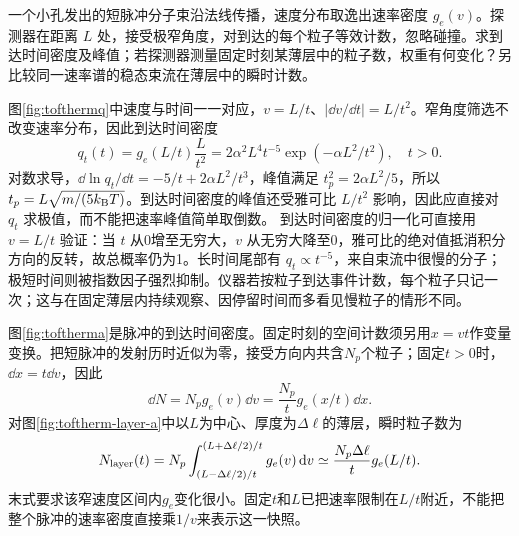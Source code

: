 \begin{example}[时间飞行测温中的两种探测权重]
一个小孔发出的短脉冲分子束沿法线传播，速度分布取逸出速率密度 $g_e(v)$。探测器在距离 $L$ 处，接受极窄角度，对到达的每个粒子等效计数，忽略碰撞。求到达时间密度及峰值；若探测器测量固定时刻某薄层中的粒子数，权重有何变化？另比较同一速率谱的稳态束流在薄层中的瞬时计数。
\end{example}
\begin{solution}
图\ref{fig:tofthermq}中速度与时间一一对应，$v=L/t$、$|\dd v/\dd t|=L/t^2$。窄角度筛选不改变速率分布，因此到达时间密度
\[
 q_t(t)=g_e(L/t)\frac L{t^2}
 =2\alpha^2L^4t^{-5}\exp(-\alpha L^2/t^2),\quad t>0.
\]
对数求导，$\dd\ln q_t/\dd t=-5/t+2\alpha L^2/t^3$，峰值满足 $t_p^2=2\alpha L^2/5$，所以 $t_p=L\sqrt{m/(5k_{\mathrm B} T)}$。到达时间密度的峰值还受雅可比 $L/t^2$ 影响，因此应直接对 $q_t$ 求极值，而不能把速率峰值简单取倒数。
到达时间密度的归一化可直接用 $v=L/t$ 验证：当 $t$ 从0增至无穷大，$v$ 从无穷大降至0，雅可比的绝对值抵消积分方向的反转，故总概率仍为1。长时间尾部有 $q_t\propto t^{-5}$，来自束流中很慢的分子；极短时间则被指数因子强烈抑制。仪器若按粒子到达事件计数，每个粒子只记一次；这与在固定薄层内持续观察、因停留时间而多看见慢粒子的情形不同。

图\ref{fig:toftherma}是脉冲的到达时间密度。固定时刻的空间计数须另用$x=vt$作变量变换。把短脉冲的发射历时近似为零，接受方向内共含$N_p$个粒子；固定$t>0$时，$\dd x=t\dd v$，因此
\[
 \dd N=N_pg_e(v)\dd v
 =\frac{N_p}{t}g_e(x/t)\dd x.
\]
对图\ref{fig:toftherm-layer-a}中以$L$为中心、厚度为$\Delta\ell$的薄层，瞬时粒子数为
\[
 N_{\rm layer}(t)
 =N_p\int_{(L-\Delta\ell/2)/t}^{(L+\Delta\ell/2)/t}g_e(v)\mathop{}\!\mathrm d v
 \simeq\frac{N_p\Delta\ell}{t}g_e(L/t).
\]
末式要求该窄速度区间内$g_e$变化很小。固定$t$和$L$已把速率限制在$L/t$附近，不能把整个脉冲的速率密度直接乘$1/v$来表示这一快照。


\end{solution}
